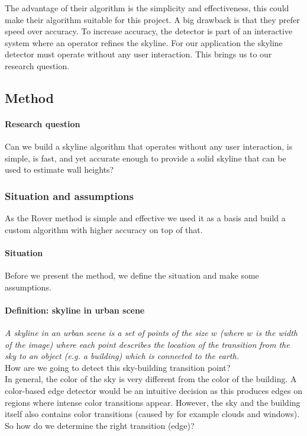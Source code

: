 The advantage of their algorithm is the simplicity and effectiveness, this
could make their algorithm suitable for this project. A big drawback is that
they prefer speed over accuracy. To increase accuracy, the detector is part
of an interactive system where an operator refines the skyline. For our
application the skyline detector must operate without any user interaction.
This brings us to our research question.




\subsection{Method}
\paragraph{Research question}
Can we build a skyline algorithm that operates without any user interaction, is
simple, is fast, and yet accurate enough to provide a solid skyline that can be
used to estimate wall heights?

\subsubsection{Situation and assumptions}
As the Rover method \cite{Rover} is simple and effective we used it as a basis and 
build a custom algorithm with higher accuracy on top of that. 
\paragraph{Situation}
Before we present the method, we define the situation and make some
assumptions.\\

\paragraph{Definition: skyline in urban scene}
\emph{A skyline in an urban scene is a set of points of the size $w$ (where $w$ is the
width of the image) where each point describes the location of the
transition from the sky to an object (e.g. a building) which is connected to the
earth.}\\

How are we going to detect this sky-building transition point?\\ 
In general, the color of the sky is very different from the color of the
building. A color-based edge detector would be an intuitive decision as this
produces edges on regions where intense  color transitions appear. However, the
sky and the building itself also contains color transitions (caused by for
example clouds and windows). So how do we determine the right transition
(edge)?\\

